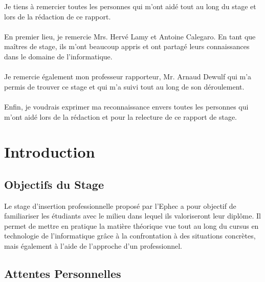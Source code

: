 \documentclass[11pt]{article}
\begin{document}
Je tiens à remercier toutes les personnes qui m'ont aidé tout au long du stage et lors de la rédaction de ce rapport.\\
\\
En premier lieu, je remercie Mrs. Hervé Lamy et Antoine Calegaro. En tant que maîtres de stage, ils m'ont beaucoup appris et ont partagé leurs connaissances dans le domaine de l'informatique.\\
\\
Je remercie également mon professeur rapporteur, Mr. Arnaud Dewulf qui m'a permis de trouver ce stage et qui m'a suivi tout au long de son déroulement.\\
\\
Enfin, je voudrais exprimer ma reconnaissance envers toutes les personnes qui m'ont aidé lors de la rédaction et pour la relecture de ce rapport de stage.

\newpage

\section{Introduction}

\subsection{Objectifs du Stage}

Le stage d'insertion professionnelle proposé par l'Ephec a pour objectif de familiariser les étudiants avec le milieu dans lequel ils valoriseront leur diplôme.
Il permet de mettre en pratique la matière théorique vue tout au long du cursus en technologie de l'informatique grâce à la confrontation à des situations concrètes, mais également à l'aide de l'approche d'un professionnel.

\subsection{Attentes Personnelles}
\end{document}
